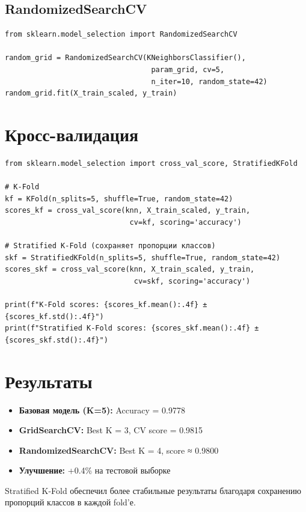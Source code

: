 \documentclass[a4paper,12pt]{article}
\begin{document}
\subsection*{RandomizedSearchCV}
\begin{lstlisting}
from sklearn.model_selection import RandomizedSearchCV

random_grid = RandomizedSearchCV(KNeighborsClassifier(), 
                                  param_grid, cv=5, 
                                  n_iter=10, random_state=42)
random_grid.fit(X_train_scaled, y_train)
\end{lstlisting}

\section*{Кросс-валидация}

\begin{lstlisting}
from sklearn.model_selection import cross_val_score, StratifiedKFold

# K-Fold
kf = KFold(n_splits=5, shuffle=True, random_state=42)
scores_kf = cross_val_score(knn, X_train_scaled, y_train, 
                             cv=kf, scoring='accuracy')

# Stratified K-Fold (сохраняет пропорции классов)
skf = StratifiedKFold(n_splits=5, shuffle=True, random_state=42)
scores_skf = cross_val_score(knn, X_train_scaled, y_train, 
                              cv=skf, scoring='accuracy')

print(f"K-Fold scores: {scores_kf.mean():.4f} ± {scores_kf.std():.4f}")
print(f"Stratified K-Fold scores: {scores_skf.mean():.4f} ± {scores_skf.std():.4f}")
\end{lstlisting}

\section*{Результаты}

\begin{itemize}
    \item \textbf{Базовая модель (K=5):} Accuracy = 0.9778
    \item \textbf{GridSearchCV:} Best K = 3, CV score = 0.9815
    \item \textbf{RandomizedSearchCV:} Best K = 4, score ≈ 0.9800
    \item \textbf{Улучшение:} +0.4\% на тестовой выборке
\end{itemize}

Stratified K-Fold обеспечил более стабильные результаты благодаря сохранению пропорций классов в каждой fold'е.
\end{document}
